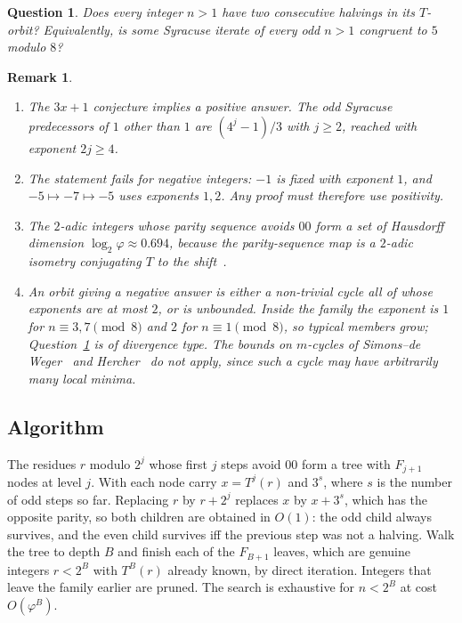 \documentclass[11pt]{article}
\newtheorem{remarkx}[theorem]{Remark}
\newenvironment{remark}{\begin{remarkx}\rmfamily}{\end{remarkx}}
\newtheorem{questionx}{Question}
\newenvironment{question}{\begin{questionx}\rmfamily}{\end{questionx}}
\begin{document}
\begin{question}\label{q}
Does every integer $n>1$ have two consecutive halvings in its $T$-orbit? Equivalently, is some Syracuse iterate of
every odd $n>1$ congruent to $5$ modulo $8$?
\end{question}

\begin{remark}\label{rem:Q}
\begin{enumerate}
\item \emph{The $3x+1$ conjecture implies a positive answer.} The odd Syracuse predecessors of $1$ other than $1$
are $(4^{j}-1)/3$ with $j\ge2$, reached with exponent $2j\ge4$.
\item \emph{The statement fails for negative integers:} $-1$ is fixed with exponent $1$, and $-5\mapsto-7\mapsto-5$
uses exponents $1,2$. Any proof must therefore use positivity.
\item The $2$-adic integers whose parity sequence avoids $00$ form a set of Hausdorff dimension
$\log_2\varphi\approx0.694$, because the parity-sequence map is a $2$-adic isometry conjugating $T$ to the shift~\cite{La85}.
\item An orbit giving a negative answer is either a non-trivial cycle all of whose exponents are at most $2$, or is
unbounded. Inside the family the exponent is $1$ for $n\equiv3,7\pmod8$ and $2$ for $n\equiv1\pmod8$, so typical
members grow; Question~\ref{q} is of divergence type. The bounds on $m$-cycles of Simons--de Weger~\cite{SdW} and
Hercher~\cite{He} do not apply, since such a cycle may have arbitrarily many local minima.
\end{enumerate}
\end{remark}

\subsection*{Algorithm}
The residues $r$ modulo $2^{j}$ whose first $j$ steps avoid $00$ form a tree with $F_{j+1}$ nodes at level $j$. With
each node carry $x=T^{j}(r)$ and $3^{s}$, where $s$ is the number of odd steps so far. Replacing $r$ by $r+2^{j}$
replaces $x$ by $x+3^{s}$, which has the opposite parity, so both children are obtained in $O(1)$: the odd child
always survives, and the even child survives iff the previous step was not a halving. Walk the tree to depth $B$
and finish each of the $F_{B+1}$ leaves, which are genuine integers $r<2^{B}$ with $T^{B}(r)$ already known, by
direct iteration. Integers that leave the family earlier are pruned. The search is exhaustive for $n<2^{B}$ at cost
$O(\varphi^{B})$.
\end{document}

